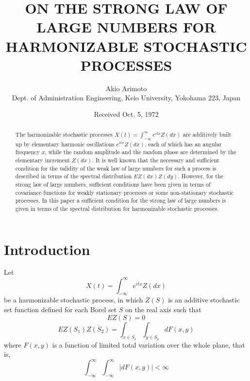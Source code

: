 \documentclass{article}
\title{ON THE STRONG LAW OF LARGE NUMBERS FOR HARMONIZABLE STOCHASTIC PROCESSES}
\author{Akio Arimoto\\
Dept. of Administration Engineering, Keio University, Yokohama 223, Japan}
\date{Received Oct. 5, 1972}
\begin{document}
\maketitle

\begin{abstract}
The harmonizable stochastic processes $X(t)=\int_{-\infty}^{\infty} e^{itx} Z(dx)$ are additively built up by elementary harmonic oscillations $e^{itx} Z(dx)$, each of which has an angular frequency $x$, while the random amplitude and the random phase are determined by the elementary increment $Z(dx)$. It is well known that the necessary and sufficient condition for the validity of the weak law of large numbers for such a process is described in terms of the spectral distribution $EZ(dx)\overline{Z(dy)}$. However, for the strong law of large numbers, sufficient conditions have been given in terms of covariance functions for weakly stationary processes or some non-stationary stochastic processes. In this paper a sufficient condition for the strong law of large numbers is given in terms of the spectral distribution for harmonizable stochastic processes.
\end{abstract}

\section{Introduction}
Let
\begin{equation}\label{eq:1}
X(t)=\int_{-\infty}^{\infty} e^{itx} Z(dx)
\end{equation}
be a harmonizable stochastic process, in which $Z(S)$ is an additive stochastic set function defined for each Borel set $S$ on the real axis such that
\begin{equation}\label{eq:2}
EZ(S)=0
\end{equation}
\begin{equation}\label{eq:3}
EZ(S_1)\overline{Z(S_2)}=\int_{x \in S_1} \int_{y \in S_2} dF(x,y)
\end{equation}
where $F(x,y)$ is a function of limited total variation over the whole plane, that is,
\begin{equation}\label{eq:4}
\int_{-\infty}^{\infty} \int_{-\infty}^{\infty}|dF(x,y)|<\infty
\end{equation}
\end{document}
